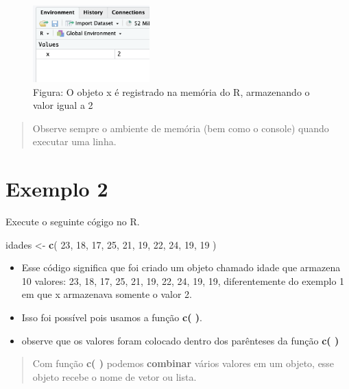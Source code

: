 \documentclass[
]{book}
\newenvironment{Shaded}{\begin{snugshade}}{\end{snugshade}}
\newcommand{\DecValTok}[1]{\textcolor[rgb]{0.00,0.00,0.81}{#1}}
\newcommand{\FunctionTok}[1]{\textcolor[rgb]{0.13,0.29,0.53}{\textbf{#1}}}
\newcommand{\NormalTok}[1]{#1}
\newcommand{\OtherTok}[1]{\textcolor[rgb]{0.56,0.35,0.01}{#1}}
\begin{document}
\begin{figure}
\centering
\includegraphics[width=0.4\textwidth,height=\textheight]{telaValorMemoria.png}
\caption{Figura: O objeto x é registrado na memória do R, armazenando o valor igual a 2}
\end{figure}

\begin{quote}
Observe sempre o ambiente de memória (bem como o console) quando executar uma linha.
\end{quote}

\section{Exemplo 2}\label{exemplo-2}

Execute o seguinte cógigo no R.

\begin{Shaded}
\begin{Highlighting}[]
\NormalTok{idades }\OtherTok{\textless{}{-}} \FunctionTok{c}\NormalTok{( }\DecValTok{23}\NormalTok{, }\DecValTok{18}\NormalTok{, }\DecValTok{17}\NormalTok{, }\DecValTok{25}\NormalTok{, }\DecValTok{21}\NormalTok{, }\DecValTok{19}\NormalTok{, }\DecValTok{22}\NormalTok{, }\DecValTok{24}\NormalTok{, }\DecValTok{19}\NormalTok{, }\DecValTok{19}\NormalTok{ )}
\end{Highlighting}
\end{Shaded}

\begin{itemize}
\item
  Esse código significa que foi criado um objeto chamado idade que armazena 10 valores: 23, 18, 17, 25, 21, 19, 22, 24, 19, 19, diferentemente do exemplo 1 em que x armazenava somente o valor 2.
\item
  Isso foi possível pois usamos a função \textbf{c( )}.
\item
  observe que os valores foram colocado dentro dos parênteses da função \textbf{c( )}
\end{itemize}

\begin{quote}
Com função \textbf{c( )} podemos \textbf{combinar} vários valores em um objeto, esse objeto recebe o nome de vetor ou lista.
\end{quote}
\end{document}
